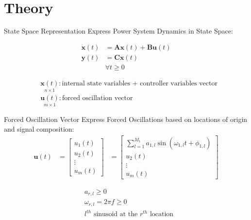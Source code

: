 \section[Theory]{Theory}
\label{sec:lasso_theory}

\begin{frame}[fragile]{State Space Representation}
	Express Power System Dynamics in State Space:

	\begin{align*}
		\dot{\textbf{x}}(t) &= 
		\textbf{A}\textbf{x}(t)
		+ \textbf{B}\textbf{u}(t)\\
		\textbf{y}(t) &= 
		\textbf{C}\textbf{x}(t)\\  
		& \forall t\geq0	
	\end{align*}
	
	\begin{align*}
		& \underset{\scriptscriptstyle n\times 1}{\textbf{x}(t)} : \text{internal state variables + controller variables vector}                                                                      \\
		& \underset{\scriptscriptstyle m\times 1}{\textbf{u}(t)} : \text{forced oscillation vector}
	\end{align*}
\end{frame}

\begin{frame}[fragile]{Forced Oscillation Vector}
	Express Forced Oscillations based on locations of origin and signal composition:
	\begin{align*}
		\textbf{u}(t) 
		&= 
		\begin{bmatrix}
			u_1(t) \\
			u_2(t) \\
			\vdots \\
			u_m(t)
		\end{bmatrix} 
		&=	
		\begin{bmatrix}
			\sum_{l=1}^{M_1} a_{1,l} \sin(\omega_{1,l}t + \phi_{1,l}) \\
			u_2(t) \\
			\vdots \\
			u_m(t)
		\end{bmatrix} 
	\end{align*}
	
	\begin{align*}
		& a_{r,l} \geq0 \\
		& \omega_{r,l} = 2\pi f \geq 0 \\
		& l^{th} \text{ sinusoid at the }  r^{th} \text{ location}
	\end{align*}

\end{frame}